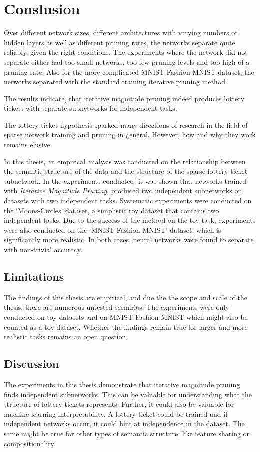 \chapter{Conslusion}\label{chapter:conclusion} 

Over different network sizes, different architectures with varying numbers of hidden layers as well as different pruning rates, the networks separate quite reliably, given the right conditions.
The experiments where the network did not separate either had too small networks, too few pruning levels and too high of a pruning rate.
Also for the more complicated MNIST-Fashion-MNIST dataset, the networks separated with the standard training iterative pruning method.

The results indicate, that iterative magnitude pruning indeed produces lottery tickets with separate subnetworks for independent tasks.

The lottery ticket hypothesis sparked many directions of research in the field of sparse network training and pruning in general.
However, how and why they work remains elusive.

In this thesis, an empirical analysis was conducted on the relationship between the semantic structure of the data and the structure of the sparse lottery ticket subnetwork.
In the experiments conducted, it was shown that networks trained with \textit{Iterative Magnitude Pruning}, produced two independent subnetworks on datasets with two independent tasks.
Systematic experiments were conducted on the `Moons-Circles' dataset, a simplistic toy dataset that contains two independent tasks.
Due to the success of the method on the toy task, experiments were also conducted on the `MNIST-Fashion-MNIST' dataset, which is significantly more realistic.
In both cases, neural networks were found to separate with non-trivial accuracy.

\section{Limitations}
The findings of this thesis are empirical, and due the the scope and scale of the thesis, there are numerous untested scenarios.
The experiments were only conducted on toy datasets and on MNIST-Fashion-MNIST which might also be counted as a toy dataset.
Whether the findings remain true for larger and more realistic tasks remains an open question.

\section{Discussion}
The experiments in this thesis demonstrate that iterative magnitude pruning finds independent subnetworks.
This can be valuable for understanding what the structure of lottery tickets represents.
Further, it could also be valuable for machine learning interpretability.
A lottery ticket could be trained and if independent networks occur, it could hint at independence in the dataset.
The same might be true for other types of semantic structure, like feature sharing or compositionality.

